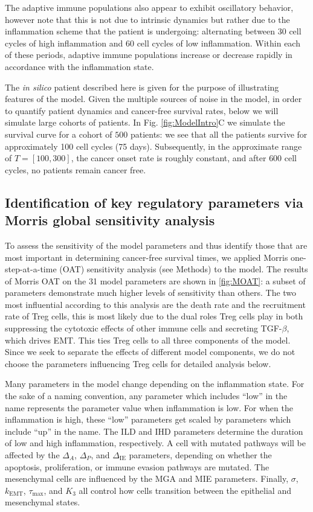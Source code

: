 \documentclass[11pt]{article}
\begin{document}
The adaptive immune populations also appear to exhibit oscillatory behavior, however note that this is not due to intrinsic dynamics but rather due to the inflammation scheme that the patient is undergoing: alternating between 30 cell cycles of high inflammation and 60 cell cycles of low inflammation. Within each of these periods, adaptive immune populations increase or decrease rapidly in accordance with the inflammation state.
\par 
The {\em in silico} patient described here is given for the purpose of illustrating features of the model. Given the multiple sources of noise in the model, in order to quantify patient dynamics and cancer-free survival rates, below we will simulate large cohorts of patients. In Fig. \ref{fig:ModelIntro}C we simulate the survival curve for a cohort of $500$ patients: we see that all the patients survive for approximately 100 cell cycles (75 days). Subsequently, in the approximate range of $T= [100,300]$, the cancer onset rate is roughly constant, and after $600$ cell cycles, no patients remain cancer free.


\subsection{Identification of key regulatory parameters via Morris global sensitivity analysis}\label{SensAnalysis}
To assess the sensitivity of the model parameters and thus identify those that are most important in determining cancer-free survival times, we applied Morris one-step-at-a-time (OAT) sensitivity analysis (see Methods) to the model.
The results of Morris OAT on the 31 model parameters are shown in \ref{fig:MOAT}: a subset of parameters demonstrate much higher levels of sensitivity than others.
The two most influential according to this analysis are the death rate and the recruitment rate of Treg cells, this is most likely due to the dual roles Treg cells play in both suppressing the cytotoxic effects of other immune cells and secreting TGF-$\beta$, which drives EMT.
This ties Treg cells to all three components of the model.
Since we seek to separate the effects of different model components, we do not choose the parameters influencing Treg cells for detailed analysis below.
\par
Many parameters in the model change depending on the inflammation state.
For the sake of a naming convention, any parameter which includes ``low'' in the name represents the parameter value when inflammation is low.
For when the inflammation is high, these ``low'' parameters get scaled by parameters which include ``up'' in the name.
The ILD and IHD parameters determine the duration of low and high inflammation, respectively.
A cell with mutated pathways will be affected by the $\Delta_A$, $\Delta_P$, and $\Delta_{\text{IE}}$ parameters, depending on whether the apoptosis, proliferation, or immune evasion pathways are mutated.
The mesenchymal cells are influenced by the MGA and MIE parameters.
Finally, $\sigma$, $k_\text{EMT}$, $\tau_\text{max}$, and $K_3$ all control how cells transition between the epithelial and mesenchymal states.
\end{document}
